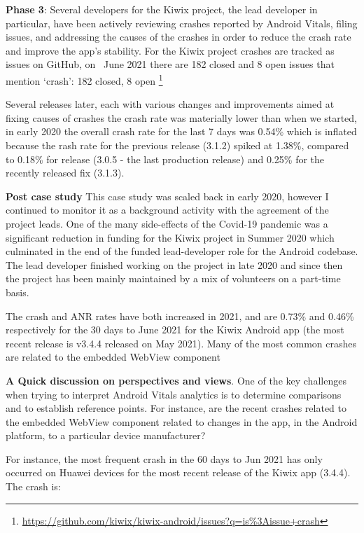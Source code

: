 \textbf{Phase 3}: Several developers for the Kiwix project, the lead developer in particular, have been actively reviewing crashes reported by Android Vitals, filing issues, and addressing the causes of the crashes in order to reduce the crash rate and improve the app's stability. For the Kiwix project crashes are tracked as issues on GitHub, on~ June 2021 there are 182 closed and 8 open issues that mention `crash': 182 closed, 8 open %
\footnote{\url{https://github.com/kiwix/kiwix-android/issues?q=is\%3Aissue+crash}}

Several releases later, each with various changes and improvements aimed at fixing causes of crashes the crash rate was materially lower than when we started, in early 2020 the overall crash rate for the last 7 days was 0.54\% which is inflated because the rash rate for the previous release (3.1.2) spiked at 1.38\%, compared to 0.18\% for release (3.0.5 -  the last production release) and 0.25\% for the recently released fix (3.1.3).

\textbf{Post case study}
This case study was scaled back in early 2020, however I continued to monitor it as a background activity with the agreement of the project leads. One of the many side-effects of the Covid-19 pandemic was a significant reduction in funding for the Kiwix project in Summer 2020 which culminated in the end of the funded lead-developer role for the Android codebase. The lead developer finished working on the project in late 2020 and since then the project has been mainly maintained by a mix of volunteers on a part-time basis. 

The crash and ANR rates have both increased in 2021, and are 0.73\% and 0.46\% respectively for the 30 days to  June 2021 for the Kiwix Android app (the most recent release is v3.4.4 released on  May 2021). Many of the most common crashes are related to the embedded WebView component 

\textbf{A Quick discussion on perspectives and views}. 
One of the key challenges when trying to interpret Android Vitals analytics is to determine comparisons and to establish reference points. For instance, are the recent crashes related to the embedded WebView component related to changes in the app, in the Android platform, to a particular device manufacturer? 

For instance, the most frequent crash in the 60 days to  Jun 2021 has only occurred on Huawei devices for the most recent release of the Kiwix app (3.4.4). The crash is:

